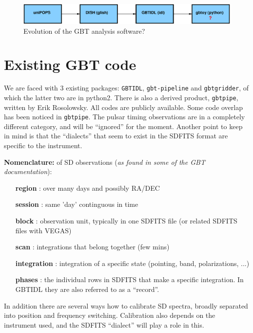 \documentclass[12pt,a4paper]{article}
\begin{document}
\begin{figure}[h]
\centering
  \includegraphics[width=\textwidth]{fig1.eps}
\caption{\label{evolution} Evolution of the GBT analysis software?}
\end{figure}


\section{Existing GBT code}

We are faced with 3 existing packages: {\tt GBTIDL}, {\tt gbt-pipeline} and
{\tt gbtgridder}, of which the latter two are in python2. There is also
a derived product, {\tt gbtpipe}, written by Erik Rosolowsky. All codes are
publicly available. Some code overlap has been noticed in {\tt gbtpipe}.
The pulsar timing observations are
in a completely different category, and will be ``ignored'' for the
moment. Another point to keep in mind is that
the ``dialects'' that seem to exist in the SDFITS format are specific to the instrument.

\bigskip\noindent
{\bf Nomenclature:} of SD observations ({\it as found in some of the GBT documentation}):
    

\begin{itemize}[leftmargin=1in]
  \item[{\bf region}]  : over many days and possibly RA/DEC
  \item[{\bf session}] : same 'day' continguous in time
  \item[{\bf block}]   : observation unit, typically in one SDFITS file (or related SDFITS files with VEGAS)
  \item[{\bf scan}]    : integrations that belong together (few mins)
  \item[{\bf integration}] : integration of a specific state (pointing, band, polarizations, ...)
  \item[{\bf phases}]    : the individual rows in SDFITS that make a specific integration.  In GBTIDL they are also
    referred to as a ``record''.
\end{itemize}   


In addition there are several ways how to calibrate SD spectra, broadly separated
into position and frequency switching. Calibration also depends on the instrument used,
and the SDFITS ``dialect'' will play a role in this.
\end{document}
